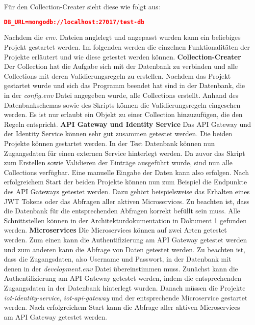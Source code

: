 Für den Collection-Creater sieht diese wie folgt aus: \newline
\begin{lstlisting}[language=json,firstnumber=1,basicstyle=\footnotesize]
DB_URL=mongodb://localhost:27017/test-db
\end{lstlisting}
Nachdem die \textit{env.} Dateien anglelegt und angepasst wurden kann ein beliebiges Projekt gestartet werden. Im folgenden werden die einzelnen Funktionalitäten der Projekte erläutert und wie diese getestet werden können. \newline
\textbf{Collection-Creater}\newline
Der Collection hat die Aufgabe sich mit der Datenbank zu verbinden und alle Collections mit deren Validierungsregeln zu erstellen. Nachdem das Projekt gestartet wurde und sich das Programm beendet hat sind in der Datenbank, die in der \textit{config.env} Datei angegeben wurde, alle Collections erstellt. Anhand des Datenbankschemas sowie des Skripts können die Validierungsregeln eingesehen werden. Es ist nur erlaubt ein Objekt zu einer Collection hinzuzufügen, die den Regeln entspricht. \newline
\textbf{API Gateway und Identity Service}\newline
Das API Gateway und der Identity Service können sehr gut zusammen getestet werden. Die beiden Projekte können gestartet werden. In der Test Datenbank können nun Zugangsdaten für einen externen Service hinterlegt werden. Da zuvor das Skript zum Erstellen sowie Validieren der Einträge ausgeführt wurde, sind nun alle Collections verfügbar. Eine manuelle Eingabe der Daten kann also erfolgen.  Nach erfolgreichem Start der beiden Projekte können nun zum Beispiel die Endpunkte des API Gateways getestet werden. Dazu gehört beispielsweise das Erhalten eines JWT Tokens oder das Abfragen aller aktiven Microservices. Zu beachten ist, dass die Datenbank für die entsprechenden Abfragen korrekt befüllt sein muss. Alle Schnittstellen können in der Architekturdokumentation in Dokument 1 gefunden werden. \newline
\textbf{Microservices}\newline
Die Microservices können auf zwei Arten getestet werden. Zum einen kann die Authentifizierung am API Gateway getestet werden und zum anderen kann die Abfrage von Daten getestet werden. Zu beachten ist, dass die Zugangsdaten, also Username und Passwort, in der Datenbank mit denen in der \textit{development.env} Datei übereinstimmen muss. \newline
Zunächst kann die Authentifizierung am API Gateway getestet werden, indem die entsprechenden Zugangsdaten in der Datenbank hinterlegt wurden. Danach müssen die Projekte \textit{iot-identity-service}, \textit{iot-api-gateway} und der entsprechende Microservice gestartet werden. Nach erfolgreichem Start kann die Abfrage aller aktiven Microservices am API Gateway getestet werden. \newline
